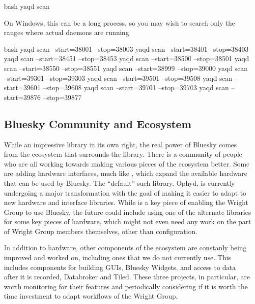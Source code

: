 \begin{codefragment}{bash}
yaqd scan
\end{codefragment}

On Windows, this can be a long process, so you may wish to search only the ranges where actual daemons are running

\begin{codefragment}{bash}
yaqd scan --start=38001 --stop=38003
yaqd scan --start=38401 --stop=38403
yaqd scan --start=38451 --stop=38453
yaqd scan --start=38500 --stop=38501
yaqd scan --start=38550 --stop=38551
yaqd scan --start=38999 --stop=39000
yaqd scan --start=39301 --stop=39303
yaqd scan --start=39501 --stop=39508
yaqd scan --start=39601 --stop=39608
yaqd scan --start=39701 --stop=39703
yaqd scan --start=39876 --stop=39877
\end{codefragment}

\subsection{Bluesky Community and Ecosystem}

While an impressive library in its own right, the real power of Bluesky comes from the ecosystem that surrounds the library.
There is a community of people who are all working towards making various pieces of the ecosystem better.
Some are adding hardware interfaces, much like \yaqcbluesky{}, which expand the available hardware that can be used by Bluesky.
The ``default'' such library, Ophyd\cite{}, is currently undergoing a major transformation with the goal of making it easier to adapt to new hardware and interface libraries\cite{NOBUGS_Ophyd_v2}.
While \yaq{} is a key piece of enabling the Wright Group to use Bluesky, the future could include using one of the alternate libraries for some key pieces of hardware, which might not even need any work on the part of Wright Group members themselves, other than configuration.

In addition to hardware, other components of the ecosystem are constanly being improved and worked on, including ones that we do not currently use.
This includes components for building GUIs, Bluesky Widgets, and access to data after it is recorded, Databroker and Tiled.
These three projects, in particular, are worth monitoring for their features and periodically considering if it is worth the time investment to adapt workflows of the Wright Group.

